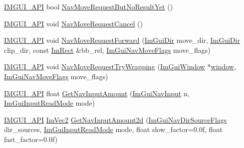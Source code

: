 \begin{DoxyCompactItemize}
\item 
\mbox{\hyperlink{imgui_8h_a43829975e84e45d1149597467a14bbf5}{I\+M\+G\+U\+I\+\_\+\+A\+PI}} bool \mbox{\hyperlink{namespace_im_gui_a3fab98556d11690efd4f7f2fde94968e}{Nav\+Move\+Request\+But\+No\+Result\+Yet}} ()
\item 
\mbox{\hyperlink{imgui_8h_a43829975e84e45d1149597467a14bbf5}{I\+M\+G\+U\+I\+\_\+\+A\+PI}} void \mbox{\hyperlink{namespace_im_gui_a43326bb080d9fa80327ed81d864d8b8d}{Nav\+Move\+Request\+Cancel}} ()
\item 
\mbox{\hyperlink{imgui_8h_a43829975e84e45d1149597467a14bbf5}{I\+M\+G\+U\+I\+\_\+\+A\+PI}} void \mbox{\hyperlink{namespace_im_gui_a8a96ace94b2000ada6f21d7459d51920}{Nav\+Move\+Request\+Forward}} (\mbox{\hyperlink{imgui_8h_a874086389bc27cc9647118d22a806403}{Im\+Gui\+Dir}} move\+\_\+dir, \mbox{\hyperlink{imgui_8h_a874086389bc27cc9647118d22a806403}{Im\+Gui\+Dir}} clip\+\_\+dir, const \mbox{\hyperlink{struct_im_rect}{Im\+Rect}} \&bb\+\_\+rel, \mbox{\hyperlink{imgui__internal_8h_aff7a453b89555bb074f2fe46a159ac25}{Im\+Gui\+Nav\+Move\+Flags}} move\+\_\+flags)
\item 
\mbox{\hyperlink{imgui_8h_a43829975e84e45d1149597467a14bbf5}{I\+M\+G\+U\+I\+\_\+\+A\+PI}} void \mbox{\hyperlink{namespace_im_gui_a95a9a1a5411cccb918fc29a0b0d3f953}{Nav\+Move\+Request\+Try\+Wrapping}} (\mbox{\hyperlink{struct_im_gui_window}{Im\+Gui\+Window}} $\ast$\mbox{\hyperlink{radar_8cpp_a80de27bd7dc4e2b2ad3d5895b97a70f0}{window}}, \mbox{\hyperlink{imgui__internal_8h_aff7a453b89555bb074f2fe46a159ac25}{Im\+Gui\+Nav\+Move\+Flags}} move\+\_\+flags)
\item 
\mbox{\hyperlink{imgui_8h_a43829975e84e45d1149597467a14bbf5}{I\+M\+G\+U\+I\+\_\+\+A\+PI}} float \mbox{\hyperlink{namespace_im_gui_a468ab885f9d3bd81cc7e8c3608c05193}{Get\+Nav\+Input\+Amount}} (\mbox{\hyperlink{imgui_8h_a8334d2b3901efd9820b64e2413967469}{Im\+Gui\+Nav\+Input}} n, \mbox{\hyperlink{imgui__internal_8h_a595aad51728e2685daff714edb3d05fd}{Im\+Gui\+Input\+Read\+Mode}} mode)
\item 
\mbox{\hyperlink{imgui_8h_a43829975e84e45d1149597467a14bbf5}{I\+M\+G\+U\+I\+\_\+\+A\+PI}} \mbox{\hyperlink{struct_im_vec2}{Im\+Vec2}} \mbox{\hyperlink{namespace_im_gui_a7b84c4630dad4ef5d07b366d36c39476}{Get\+Nav\+Input\+Amount2d}} (\mbox{\hyperlink{imgui__internal_8h_a83858661b68556d7da82de40d020e152}{Im\+Gui\+Nav\+Dir\+Source\+Flags}} dir\+\_\+sources, \mbox{\hyperlink{imgui__internal_8h_a595aad51728e2685daff714edb3d05fd}{Im\+Gui\+Input\+Read\+Mode}} mode, float slow\+\_\+factor=0.\+0f, float fast\+\_\+factor=0.\+0f)

\end{DoxyCompactItemize}
